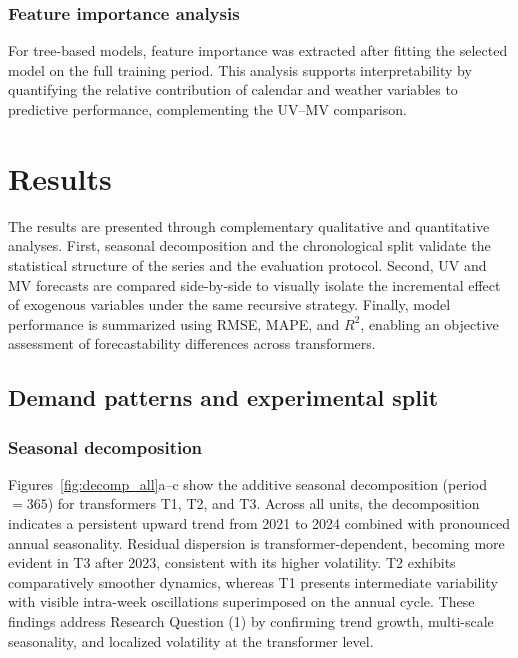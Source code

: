 \subsubsection{Feature importance analysis}
For tree-based models, feature importance was extracted after fitting the selected model on the full training period. This analysis supports interpretability by quantifying the relative contribution of calendar and weather variables to predictive performance, complementing the UV--MV comparison.


\section{Results}
\label{sec:results}

The results are presented through complementary qualitative and quantitative analyses. First, seasonal decomposition and the chronological split validate the statistical structure of the series and the evaluation protocol. Second, UV and MV forecasts are compared side-by-side to visually isolate the incremental effect of exogenous variables under the same recursive strategy. Finally, model performance is summarized using RMSE, MAPE, and $R^2$, enabling an objective assessment of forecastability differences across transformers.


\subsection{Demand patterns and experimental split}
\label{subsec:results_patterns_split}

\subsubsection{Seasonal decomposition}
Figures~\ref{fig:decomp_all}a--c show the additive seasonal decomposition (period $=365$) for transformers T1, T2, and T3. Across all units, the decomposition indicates a persistent upward trend from 2021 to 2024 combined with pronounced annual seasonality. Residual dispersion is transformer-dependent, becoming more evident in T3 after 2023, consistent with its higher volatility. T2 exhibits comparatively smoother dynamics, whereas T1 presents intermediate variability with visible intra-week oscillations superimposed on the annual cycle. These findings address Research Question (1) by confirming trend growth, multi-scale seasonality, and localized volatility at the transformer level.

